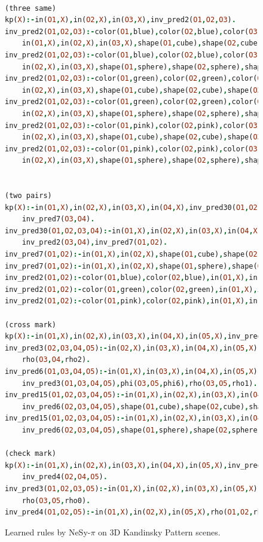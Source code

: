 \documentclass[
]{ceurart}
\begin{document}
\begin{figure}[t]
	\centering
	\begin{lstlisting}[language=Prolog,  style=Prolog-pygsty]

(three same)
kp(X):-in(O1,X),in(O2,X),in(O3,X),inv_pred2(O1,O2,O3).
inv_pred2(O1,O2,O3):-color(O1,blue),color(O2,blue),color(O3,blue),
	in(O1,X),in(O2,X),in(O3,X),shape(O1,cube),shape(O2,cube),shape(O3,cube).
inv_pred2(O1,O2,O3):-color(O1,blue),color(O2,blue),color(O3,blue),in(O1,X),
	in(O2,X),in(O3,X),shape(O1,sphere),shape(O2,sphere),shape(O3,sphere).
inv_pred2(O1,O2,O3):-color(O1,green),color(O2,green),color(O3,green),in(O1,X),
	in(O2,X),in(O3,X),shape(O1,cube),shape(O2,cube),shape(O3,cube).
inv_pred2(O1,O2,O3):-color(O1,green),color(O2,green),color(O3,green),in(O1,X),
	in(O2,X),in(O3,X),shape(O1,sphere),shape(O2,sphere),shape(O3,sphere).
inv_pred2(O1,O2,O3):-color(O1,pink),color(O2,pink),color(O3,pink),in(O1,X),
	in(O2,X),in(O3,X),shape(O1,cube),shape(O2,cube),shape(O3,cube).
inv_pred2(O1,O2,O3):-color(O1,pink),color(O2,pink),color(O3,pink),in(O1,X),
	in(O2,X),in(O3,X),shape(O1,sphere),shape(O2,sphere),shape(O3,sphere).


(two pairs)
kp(X):-in(O1,X),in(O2,X),in(O3,X),in(O4,X),inv_pred30(O1,O2,O3,O4),
	inv_pred7(O3,O4).
inv_pred30(O1,O2,O3,O4):-in(O1,X),in(O2,X),in(O3,X),in(O4,X),inv_pred2(O1,O2),
	inv_pred2(O3,O4),inv_pred7(O1,O2).
inv_pred7(O1,O2):-in(O1,X),in(O2,X),shape(O1,cube),shape(O2,cube).
inv_pred7(O1,O2):-in(O1,X),in(O2,X),shape(O1,sphere),shape(O2,sphere).
inv_pred2(O1,O2):-color(O1,blue),color(O2,blue),in(O1,X),in(O2,X).
inv_pred2(O1,O2):-color(O1,green),color(O2,green),in(O1,X),in(O2,X).
inv_pred2(O1,O2):-color(O1,pink),color(O2,pink),in(O1,X),in(O2,X).

(cross mark)
kp(X):-in(O1,X),in(O2,X),in(O3,X),in(O4,X),in(O5,X),inv_pred15(O1,O2,O3,O4,O5).
inv_pred3(O2,O3,O4,O5):-in(O2,X),in(O3,X),in(O4,X),in(O5,X),rho(O2,O5,rho2),
	rho(O3,O4,rho2).
inv_pred6(O1,O3,O4,O5):-in(O1,X),in(O3,X),in(O4,X),in(O5,X),
	inv_pred3(O1,O3,O4,O5),phi(O3,O5,phi6),rho(O3,O5,rho1).
inv_pred15(O1,O2,O3,O4,O5):-in(O1,X),in(O2,X),in(O3,X),in(O4,X),in(O5,X),
	inv_pred6(O2,O3,O4,O5),shape(O1,cube),shape(O2,cube),shape(O3,cube).
inv_pred15(O1,O2,O3,O4,O5):-in(O1,X),in(O2,X),in(O3,X),in(O4,X),in(O5,X),
	inv_pred6(O2,O3,O4,O5),shape(O1,sphere),shape(O2,sphere),shape(O3,sphere).

(check mark)
kp(X):-in(O1,X),in(O2,X),in(O3,X),in(O4,X),in(O5,X),inv_pred3(O1,O2,O3,O5),
	inv_pred4(O2,O4,O5).
inv_pred3(O1,O2,O3,O5):-in(O1,X),in(O2,X),in(O3,X),in(O5,X),rho(O1,O2,rho0),
	rho(O3,O5,rho0).
inv_pred4(O1,O2,O5):-in(O1,X),in(O2,X),in(O5,X),rho(O1,O2,rho0),rho(O1,O5,rho0).
	\end{lstlisting}
	\label{fig:rules_cross_3DKP}
	\caption{Learned rules by NeSy-$\pi$ on 3D Kandinsky Pattern scenes.}
\end{figure}
\end{document}
